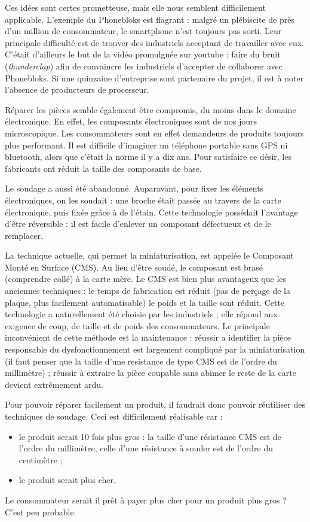 \bigbreak 

Ces idées sont certes prometteuse, mais elle nous semblent difficilement applicable. L'exemple du Phonebloks est flagrant : malgré un plébiscite de près d'un million de consommateur, le smartphone n'est toujours pas sorti. Leur principale difficulté est de trouver des industriels acceptant de travailler avec eux. C'était d'ailleurs le but de la vidéo promulguée sur youtube \cite{pb_yt} : faire du bruit (\textit{thunderclap}) afin de convaincre les industriels d'accepter de collaborer avec Phonebloks. Si une quinzaine d'entreprise sont partenaire du projet, il est à noter l'absence de producteurs de processeur. 


\medbreak
Réparer les pièces semble également être compromis, du moins dans le domaine électronique. En effet, les composants électroniques sont de nos jours microscopique. Les consommateurs sont en effet demandeurs de produits toujours plus performant. Il est difficile d'imaginer un téléphone portable sans GPS ni bluetooth, alors que c'était la norme il y a dix ans. Pour satisfaire ce désir, les fabricants ont réduit la taille des composants de base. 

Le soudage a aussi été abandonné. Auparavant, pour fixer les éléments électroniques, on les soudait : une broche était passée au travers de la carte électronique, puis fixée grâce à de l'étain. Cette technologie possédait l'avantage d'être réversible : il est facile d'enlever un composant défectueux et de le remplacer. 

La technique actuelle, qui permet la miniaturisation, est appelée le Composant Monté en Surface (CMS). Au lieu d'être soudé, le composant est brasé (comprendre collé) à la carte mère. Le CMS est bien plus avantageux que les anciennes techniques : le temps de fabrication est réduit (pas de perçage de la plaque, plus facilement automatisable) le poids et la taille  sont réduit. Cette technologie a naturellement été choisie par les industriels ; elle répond aux exigence de coup, de taille et de poids des consommateurs. Le principale inconvénient de cette méthode est la maintenance : réussir a identifier la pièce responsable du dysfonctionnement est largement compliqué par la miniaturisation (il faut penser que la taille d'une resistance de type CMS est de  l'ordre du millimètre) ; réussir à extraire la pièce coupable sans abimer le reste de la carte devient extrêmement ardu. 

Pour pouvoir  réparer facilement un produit, il faudrait donc pouvoir réutiliser des techniques de soudage. Ceci est difficilement réalisable car : 
\begin{itemize}
\item le produit serait 10 fois plus gros : la taille d'une résistance CMS est de l'ordre du millimètre, celle d'une résistance à souder est de l'ordre du centimètre ;
\item le produit serait plus cher. 
\end{itemize}
Le consommateur serait il prêt à payer plus cher pour un produit plus gros ? C'est peu probable.

